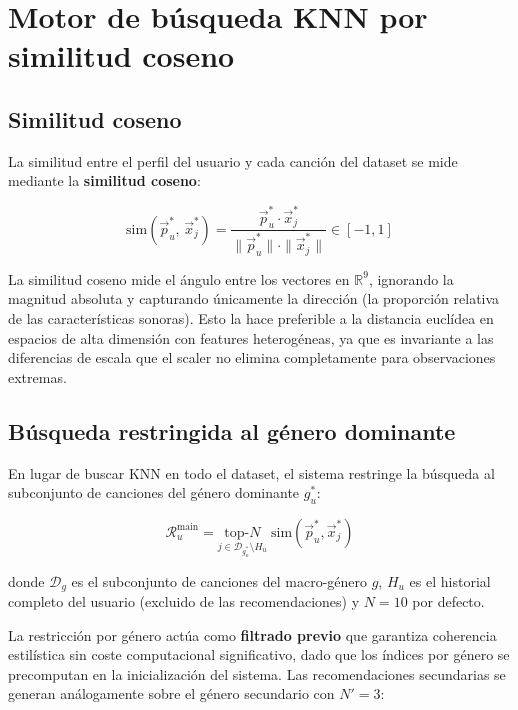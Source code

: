 \documentclass[12pt, a4paper]{book}
\theoremstyle{definition}
\begin{document}
\section{Motor de búsqueda KNN por similitud coseno}
\label{sec:knn_coseno}

\subsection{Similitud coseno}

La similitud entre el perfil del usuario y cada canción del dataset se mide
mediante la \textbf{similitud coseno}:

\begin{equation}
\label{eq:coseno}
\text{sim}(\vec{p}_u^*,\, \vec{x}_j^*) =
\frac{\vec{p}_u^* \cdot \vec{x}_j^*}
     {\|\vec{p}_u^*\| \cdot \|\vec{x}_j^*\|}
\in [-1, 1]
\end{equation}

La similitud coseno mide el ángulo entre los vectores en $\mathbb{R}^9$,
ignorando la magnitud absoluta y capturando únicamente la dirección (la
proporción relativa de las características sonoras). Esto la hace preferible
a la distancia euclídea en espacios de alta dimensión con features
heterogéneas, ya que es invariante a las diferencias de escala que el scaler
no elimina completamente para observaciones extremas.

\subsection{Búsqueda restringida al género dominante}

En lugar de buscar KNN en todo el dataset, el sistema restringe la búsqueda
al subconjunto de canciones del género dominante $g_u^*$:

\begin{equation}
\label{eq:rec_main}
\mathcal{R}_u^{\text{main}} = \underset{j \in \mathcal{D}_{g_u^*}
    \setminus H_u}{\text{top-}N}
    \; \text{sim}(\vec{p}_u^*, \vec{x}_j^*)
\end{equation}

donde $\mathcal{D}_{g}$ es el subconjunto de canciones del macro-género $g$,
$H_u$ es el historial completo del usuario (excluido de las recomendaciones)
y $N = 10$ por defecto.

La restricción por género actúa como \textbf{filtrado previo} que garantiza
coherencia estilística sin coste computacional significativo, dado que los
índices por género se precomputan en la inicialización del sistema. Las
recomendaciones secundarias se generan análogamente sobre el género secundario
con $N' = 3$:
\end{document}

